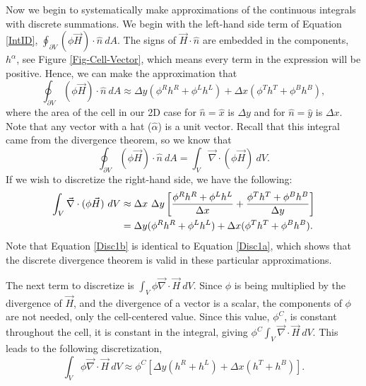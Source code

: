 \documentclass[11pt,letterpaper,oneside,notitlepage]{article}	%
\newcommand{\del}{\vec\nabla}				%
\newcommand{\eq}[1]{Equation \eqref{#1}}		%
\numberwithin{equation}{section}				%
\begin{document}
Now we begin to systematically make approximations of the continuous integrals with discrete summations.  We begin with the left-hand side term of \eq{IntID}, $\oint_{\partial V}(\phi\vec H)\cdot\hat n\ dA$.  The signs of $\vec H\cdot\hat n$ are embedded in the components, $h^\alpha$, see Figure \ref{Fig-Cell-Vector}, which means every term in the expression will be positive.  Hence, we can make the approximation that
\begin{equation}
\oint_{\partial V}(\phi\vec H)\cdot\hat n\ dA \approx \Delta y (\phi^R h^R + \phi^L h^L) + \Delta x (\phi^T h^T + \phi^B h^B)\label{Disc1a},
\end{equation}
where the area of the cell in our 2D case for $\hat n = \hat x$ is $\Delta y$ and for $\hat n = \hat y$ is $\Delta x$.  Note that any vector with a hat ($\hat \alpha$) is a unit vector.   
Recall that this integral came from the divergence theorem, so we know that 
\begin{equation}
\oint_{\partial V}(\phi\vec H)\cdot\hat n\ dA = \int_V \del\cdot(\phi \vec H)\ dV.
\end{equation}
If we wish to discretize the right-hand side, we have the following:
\begin{align}
\notag\int_V \del\cdot(\phi \vec H)\ dV &\approx \Delta x\  \Delta y\left[\frac{\phi^R h^R + \phi^L h^L}{\Delta x} + \frac{\phi^T h^T +\phi^B h^B}{\Delta y}\right] \\
&= \Delta y (\phi^R h^R + \phi^L h^L) + \Delta x (\phi^T h^T + \phi^B h^B)\label{Disc1b}.
\end{align}
Note that \eq{Disc1b} is identical to \eq{Disc1a}, which shows that the discrete divergence theorem is valid in these particular approximations.

The next term to discretize is $\int_V\phi\del\cdot\vec H\ dV$.  Since $\phi$ is being multiplied by the divergence of $\vec H$, and the divergence of a vector is a scalar, the components of $\phi$ are not needed, only the cell-centered value.  Since this value, $\phi^C$, is constant throughout the cell, it is constant in the integral, giving $\phi^C\int_V\del\cdot\vec H\ dV $.  This leads to the following discretization,
\begin{equation}
\int_V\phi\del\cdot\vec H\ dV \approx \phi^C\left[ \Delta y (h^R + h^L) + \Delta x (h^T + h^B)\right]\label{Disc2}.
\end{equation}
\end{document}
